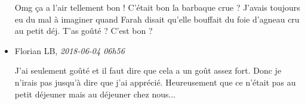 \documentclass[]{article}
\begin{document}
\begin{itemize}
  Omg ça a l'air tellement bon ! C'était bon la barbaque crue ? J'avais
  toujours eu du mal à imaginer quand Farah disait qu'elle bouffait du
  foie d'agneau cru au petit déj. T'as goûté ? C'est bon ?
\item
  Florian LB, \emph{2018-06-04 06h56}

  J'ai seulement goûté et il faut dire que cela a un goût assez fort.
  Donc je n'irais pas jusqu'à dire que j'ai apprécié. Heureusement que
  ce n'était pas au petit déjeuner mais au déjeuner chez nous...
\end{itemize}
\end{document}
